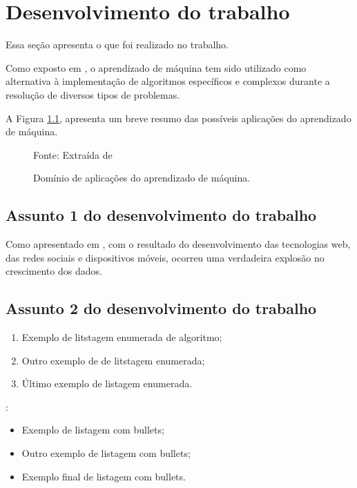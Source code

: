 \chapter{Desenvolvimento do trabalho}\label{cap:desenvolvimento_trabalho}
Essa seção apresenta o que foi realizado no trabalho.

Como exposto em \cite{Torralba2008}, o aprendizado de máquina tem sido utilizado como alternativa à implementação de algoritmos específicos e complexos durante a resolução de diversos tipos de problemas. 

\lipsum[6]

A Figura \ref{fig:mlapplications}, apresenta um breve resumo das possíveis aplicações do aprendizado de máquina.

\begin{figure}[ht]
    \centering
    \caption{Domínio de aplicações do aprendizado de máquina.}
            {Fonte: Extraída de \cite{ApplicationMachineLearning}}
    \label{fig:mlapplications}
\end{figure}

\lipsum[22]

\section{Assunto 1 do desenvolvimento do trabalho}

Como apresentado em \cite{mohri2018foundations}, com o resultado do desenvolvimento das tecnologias web, das redes sociais e dispositivos móveis, ocorreu uma verdadeira explosão no crescimento dos dados. 

\lipsum[23-27]

\section{Assunto 2 do desenvolvimento do trabalho}

\lipsum[23-27]

\begin{enumerate}
    \item Exemplo de litstagem enumerada de algoritmo;
    \item Outro exemplo de de litstagem enumerada;
    \item Último exemplo de listagem enumerada.
\end{enumerate}

\lipsum[28]:

\begin{itemize}
    \item Exemplo de listagem com bullets;
    \item Outro exemplo de listagem com bullets; 
    \item Exemplo final de listagem com bullets. 
\end{itemize}
